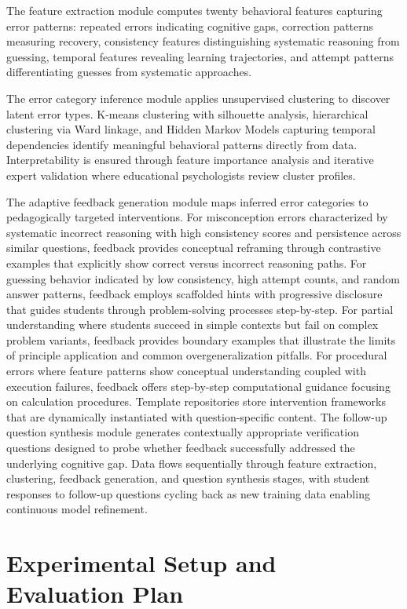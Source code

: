 \documentclass[conference]{IEEEtran}
\begin{document}
The feature extraction module computes twenty behavioral features capturing error patterns: repeated errors indicating cognitive gaps, correction patterns measuring recovery, consistency features distinguishing systematic reasoning from guessing, temporal features revealing learning trajectories, and attempt patterns differentiating guesses from systematic approaches.

The error category inference module applies unsupervised clustering to discover latent error types. K-means clustering with silhouette analysis, hierarchical clustering via Ward linkage, and Hidden Markov Models capturing temporal dependencies identify meaningful behavioral patterns directly from data. Interpretability is ensured through feature importance analysis and iterative expert validation where educational psychologists review cluster profiles.

The adaptive feedback generation module maps inferred error categories to pedagogically targeted interventions. For misconception errors characterized by systematic incorrect reasoning with high consistency scores and persistence across similar questions, feedback provides conceptual reframing through contrastive examples that explicitly show correct versus incorrect reasoning paths. For guessing behavior indicated by low consistency, high attempt counts, and random answer patterns, feedback employs scaffolded hints with progressive disclosure that guides students through problem-solving processes step-by-step. For partial understanding where students succeed in simple contexts but fail on complex problem variants, feedback provides boundary examples that illustrate the limits of principle application and common overgeneralization pitfalls. For procedural errors where feature patterns show conceptual understanding coupled with execution failures, feedback offers step-by-step computational guidance focusing on calculation procedures. Template repositories store intervention frameworks that are dynamically instantiated with question-specific content. The follow-up question synthesis module generates contextually appropriate verification questions designed to probe whether feedback successfully addressed the underlying cognitive gap. Data flows sequentially through feature extraction, clustering, feedback generation, and question synthesis stages, with student responses to follow-up questions cycling back as new training data enabling continuous model refinement.

\section{Experimental Setup and Evaluation Plan}
\end{document}
